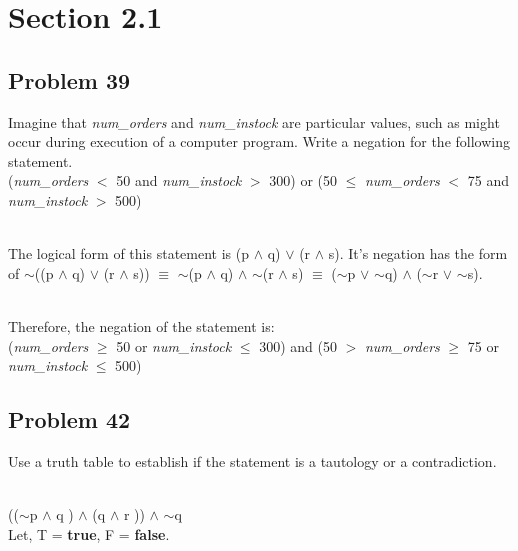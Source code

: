 \documentclass{article}
\begin{document}
\section*{Section 2.1}
\subsection*{Problem 39}
Imagine that \textit{num\_orders} and \textit{num\_instock} are particular
values, such as might occur during execution of a computer
program. Write a negation for the following statement.
\\ (\textit{num\_orders} $<$ 50 and \textit{num\_instock} $>$ 300) or
(50 $\leq$ \textit{num\_orders} $<$ 75 and \textit{num\_instock} $>$ 500)

\\ The logical form of this statement is (p $\wedge$ q) $\vee$ (r $\wedge$ s). It's negation has the form of $\sim$((p $\wedge$ q) $\vee$ (r $\wedge$ s)) $\equiv$ $\sim$(p $\wedge$ q) $\wedge$ $\sim$(r $\wedge$ s) $\equiv$ ($\sim$p $\vee$ $\sim$q) $\wedge$ ($\sim$r $\vee$  $\sim$s).

\\Therefore, the negation of the statement is: 
\\(\textit{num\_orders} $\geq$ 50 or \textit{num\_instock} $\leq$ 300) and
(50 $>$ \textit{num\_orders} $\geq$ 75 or \textit{num\_instock} $\leq$ 500)

\subsection*{Problem 42}
Use a truth table to establish if the statement is a tautology or a contradiction.

\\ (($\sim$p $\wedge$ q ) $\wedge$ (q $\wedge$ r )) $\wedge$ $\sim$q
\\ Let, T = \textbf{true}, F = \textbf{false}.
\end{document}
